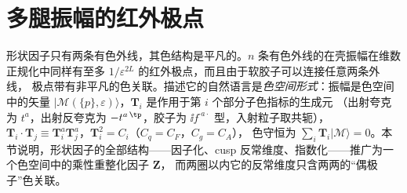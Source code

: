 \section{多腿振幅的红外极点}\label{sec:sudakov-multileg}

形状因子只有两条有色外线，其色结构是平凡的。$n$ 条有色外线的在壳振幅在维数正规化中同样有至多 $1/\varepsilon^{2L}$ 的红外极点，而且由于软胶子可以连接任意两条外线，
极点带有非平凡的色关联。描述它的自然语言是\emph{色空间形式}：振幅是色空间中的矢量 $|\mathcal M(\{p\},\varepsilon)\rangle$，$\mathbf T_i$ 是作用于第 $i$ 个部分子色指标的生成元
（出射夸克为 $t^a$，出射反夸克为 $-t^{a\,\tp}$，胶子为 $\ii f^{\cdot a\cdot}$ 型，入射粒子取共轭），$\mathbf T_i\cdot\mathbf T_j\equiv\mathbf T_i^a\mathbf T_j^a$，$\mathbf T_i^2=C_i$（$C_q=C_F$，$C_g=C_A$），
色守恒为 $\sum_i\mathbf T_i|\mathcal M\rangle=0$。本节说明，形状因子的全部结构——因子化、cusp 反常维度、指数化——推广为一个色空间中的乘性重整化因子 $\mathbf Z$，
而两圈以内它的反常维度只含两两的“偶极子”色关联。


